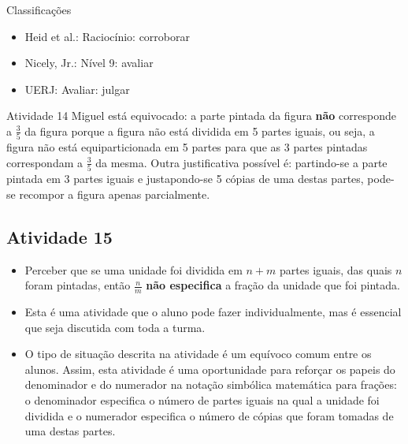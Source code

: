 \begin{multicols}{2}
  Classificações
\begin{itemize} %
    \item       Heid et al.: Raciocínio: corroborar
    \item       Nicely, Jr.: Nível 9: avaliar
    \item       UERJ: Avaliar: julgar
\end{itemize} %



\begin{resposta*}{Atividade 14}
  Miguel está equivocado: a parte pintada da figura   {\bf não}   corresponde a   $\frac{3}{5}$   da figura porque a figura não está dividida em 5 partes iguais, ou seja, a figura não está equiparticionada em 5 partes para que as 3 partes pintadas correspondam a   $\frac{3}{5}$   da mesma. Outra justificativa possível é: partindo-se a parte pintada em 3 partes iguais e justapondo-se 5 cópias de uma destas partes, pode-se recompor a figura apenas parcialmente.

\end{resposta*}

\clearpage

\subsection{Atividade 15}



  \vspace{.1cm}

  \begin{itemize} %
    \item       Perceber que se uma unidade foi dividida em       $n + m$       partes iguais, das quais       $n$       foram pintadas, então       $\frac{n}{m}$             {\bf não especifica}       a fração da unidade que foi pintada.
\end{itemize} %


  \vspace{.1cm} 
  
  \vspace{.1cm}
  
\begin{itemize} %
    \item       Esta é uma atividade que o aluno pode fazer individualmente, mas é essencial que seja discutida com toda a turma.
    \item       O tipo de situação descrita na atividade é um equívoco comum entre os alunos. Assim, esta atividade é uma oportunidade para reforçar os papeis do denominador e do numerador na notação simbólica matemática para frações: o denominador especifica o número de partes iguais na qual a unidade foi dividida e o numerador especifica o número de cópias que foram tomadas de uma destas partes.
\end{itemize} %



\end{multicols}
